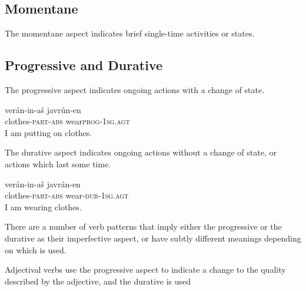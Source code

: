 \documentclass[grammar]{subfiles}
\begin{document}
\subsection{Momentane}
\label{vp:ssec_momentane}

The momentane aspect indicates brief single-time activities or states.


\subsection{Progressive and Durative}
\label{vp:ssec_progressive_durative}

The progressive aspect indicates ongoing actions with a change of state.  

\begin{exe}
  \ex\label{ex:vp_putting_on_clothes} 
  \gll verán-in-aš javrún-en\\
  clothes\textsc{-part-abs} wear\textsc{\bs prog-1sg.agt}\\
  \glt I am putting on clothes.
\end{exe}

The durative aspect indicates ongoing actions without a change of state, or
actions which last some time.

\begin{exe}
  \ex\label{ex:vp_wearing_clothes} 
  \gll verán-in-aš javrán-en\\
  clothes\textsc{-part-abs} wear\textsc{-dur-1sg.agt}\\
  \glt I am wearing clothes.
\end{exe}

There are a number of verb patterns that imply either the progressive or the durative as their imperfective aspect, 
or have subtly different meanings depending on which is used.  

Adjectival verbs use the progressive aspect to indicate a change to 
the quality described by the adjective, and the durative is used 




\end{document}
